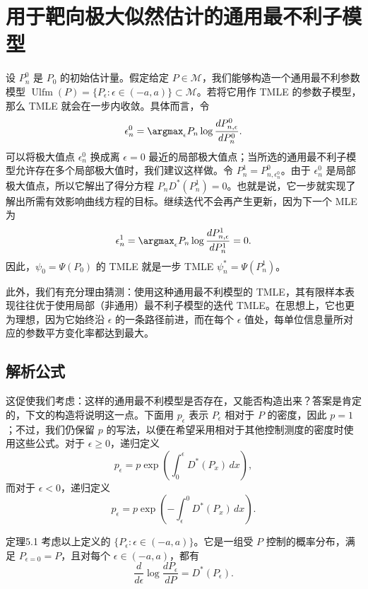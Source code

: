 \section{用于靶向极大似然估计的通用最不利子模型}

设 $P_n^0$ 是 $P_0$ 的初始估计量。假定给定 $P\in\mathcal M$，我们能够构造一个通用最不利参数模型 $\operatorname{Ulfm}(P)=\{P_\epsilon:\epsilon\in(-a,a)\}\subset\mathcal M$。若将它用作 TMLE 的参数子模型，那么 TMLE 就会在一步内收敛。具体而言，令
\[
 \epsilon_n^0=\argmax_\epsilon P_n\log\frac{dP_{n,\epsilon}^0}{dP_n^0}.
\]
可以将极大值点 $\epsilon_n^0$ 换成离 $\epsilon=0$ 最近的局部极大值点；当所选的通用最不利子模型允许存在多个局部极大值时，我们建议这样做。令 $P_n^1=P_{n,\epsilon_n^0}^0$。由于 $\epsilon_n^0$ 是局部极大值点，所以它解出了得分方程 $P_nD^*(P_n^1)=0$。也就是说，它一步就实现了解出所需有效影响曲线方程的目标。继续迭代不会再产生更新，因为下一个 MLE 为
\[
 \epsilon_n^1=\argmax_\epsilon P_n\log\frac{dP_{n,\epsilon}^1}{dP_n^1}=0.
\]
因此，$\psi_0=\Psi(P_0)$ 的 TMLE 就是一步 TMLE $\psi_n^*=\Psi(P_n^1)$。

此外，我们有充分理由猜测：使用这种通用最不利模型的 TMLE，其有限样本表现往往优于使用局部（非通用）最不利子模型的迭代 TMLE。在思想上，它也更为理想，因为它始终沿 $\epsilon$ 的一条路径前进，而在每个 $\epsilon$ 值处，每单位信息量所对应的参数平方变化率都达到最大。

\subsection{解析公式}

这促使我们考虑：这样的通用最不利模型是否存在，又能否构造出来？答案是肯定的，下文的构造将说明这一点。下面用 $p_\epsilon$ 表示 $P_\epsilon$ 相对于 $P$ 的密度，因此 $p=1$；不过，我们仍保留 $p$ 的写法，以便在希望采用相对于其他控制测度的密度时使用这些公式。对于 $\epsilon\geq0$，递归定义
\begin{equation}
 p_\epsilon=p\exp\left(\int_0^\epsilon D^*(P_x)\,dx\right),
 \tag{5.2}
\end{equation}
而对于 $\epsilon<0$，递归定义
\[
 p_\epsilon=p\exp\left(-\int_\epsilon^0 D^*(P_x)\,dx\right).
\]

\begin{bookresult}{定理}{5.1}
考虑以上定义的 $\{P_\epsilon:\epsilon\in(-a,a)\}$。它是一组受 $P$ 控制的概率分布，满足 $P_{\epsilon=0}=P$，且对每个 $\epsilon\in(-a,a)$，都有
\[
 \frac{d}{d\epsilon}\log\frac{dP_\epsilon}{dP}=D^*(P_\epsilon).
\]
\end{bookresult}

